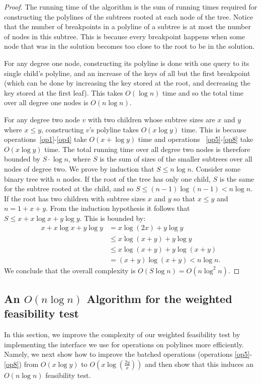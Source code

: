 \documentclass[11pt,a4paper]{article}
\theoremstyle{definition}
\theoremstyle{remark}
\begin{document}
\begin{proof}

The running time of the algorithm is the sum of running times required for constructing the polylines of the subtrees rooted at each node of the tree.
%
Notice that the number of breakpoints in a polyline of a subtree is at most the number of nodes in this subtree. This is because every breakpoint happens when some node that was in the solution becomes too close to the root to be in the solution. 

For any degree one node, constructing its polyline is done with one query to its single child's polyline, and an increase of the keys of all but the first breakpoint (which can be done by increasing the key stored at the root, and decreasing the key stored at the first leaf). This takes $O(\log n)$ time and so the total time over all degree one nodes is $O(n \log n)$.
 
For any degree two node $v$ with two children whose subtree sizes are $x$ and $y$ where $x \leq y$, constructing $v$'s polyline takes $O(x \log y)$ time. This is because operations~\ref{op1}-\ref{op4} take $O(x+ \log y)$ time and operations ~\ref{op5}-\ref{op8} take $O(x \log y)$ time.  The total running time over all degree two nodes is therefore bounded by $S \cdot \log n$, where $S$ is the sum of sizes of the smaller subtrees over all nodes of degree two. 
%
We prove by induction that $S \leq n \log n$. Consider some binary tree with $n$ nodes. If the root of the tree has only one child, $S$ is the same for the subtree rooted at the child, and so $S \leq (n-1)\log (n-1) < n \log n$. If the root has two children with subtree sizes $x$ and $y$ so that $x\le y$ and $n=1+x+y$. From the induction hypothesis it follows that $S \leq x + x \log x + y \log y$. This is bounded by:
\begin{align*}
x + x\log x + y\log y &= x \log (2x) + y\log y \\
& \leq x \log (x+y) + y\log y \\
& \leq x \log (x+y) + y \log (x+y) \\
& = (x+y)\log(x+y) < n \log n.
\end{align*}
We conclude that the overall complexity is $O(S \log n) = O(n \log ^2 n)$.
\end{proof}


\subsection{An \boldmath$O(n \log n)$ Algorithm for the weighted feasibility test}\label{section:data structure}
In this section, we improve the complexity of our weighted feasibility test by implementing the interface we use for operations on polylines more efficiently. Namely, we next show how to improve the batched operations (operations \ref{op5}-\ref{op8}) from $O(x \log y)$ to $O(x \log (\frac{2y}{x}))$ and then show that this induces an  $O(n \log n)$ feasibility test. 
\end{document}
